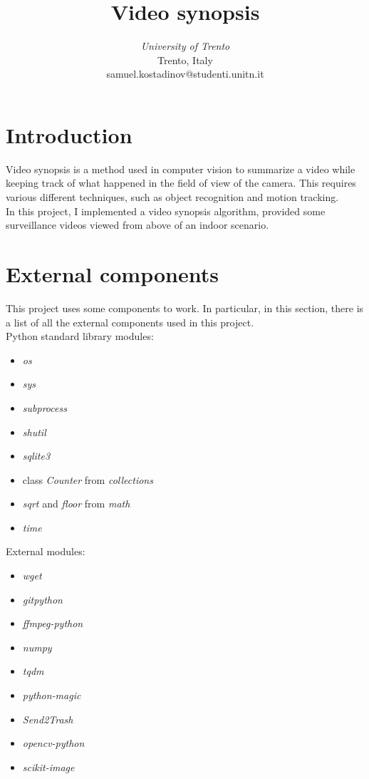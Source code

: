 \documentclass[conference]{IEEEtran}
\begin{document}
	\title{Video synopsis}


	\author{
	\textit{University of Trento}\\
	Trento, Italy \\
	samuel.kostadinov@studenti.unitn.it}


	\maketitle

	\section{Introduction}
		
		Video synopsis is a method used in computer vision to summarize a video while keeping track of what happened in the field of view of the camera.
		This requires various different techniques, such as object recognition and motion tracking.\\
		In this project, I implemented a video synopsis algorithm, provided some surveillance videos viewed from above of an indoor scenario.
		
	\section{External components}
	
		This project uses some components to work. In particular, in this section, there is a list of all the external components used in this project.\\
		Python standard library modules:
		\begin{itemize}
		
			\item \textit{os}
			\item \textit{sys}
			\item \textit{subprocess}
			\item \textit{shutil}
			\item \textit{sqlite3}
			\item class \textit{Counter} from \textit{collections}
			\item \textit{sqrt} and \textit{floor} from \textit{math}
			\item \textit{time}
		
		\end{itemize}
		
		External modules:
		\begin{itemize}
		
			\item \textit{wget}
			\item \textit{gitpython}
			\item \textit{ffmpeg-python}
			\item \textit{numpy}
			\item \textit{tqdm}
			\item \textit{python-magic}
			\item \textit{Send2Trash}
			\item \textit{opencv-python}
			\item \textit{scikit-image}
		
		\end{itemize}
		
\end{document}
